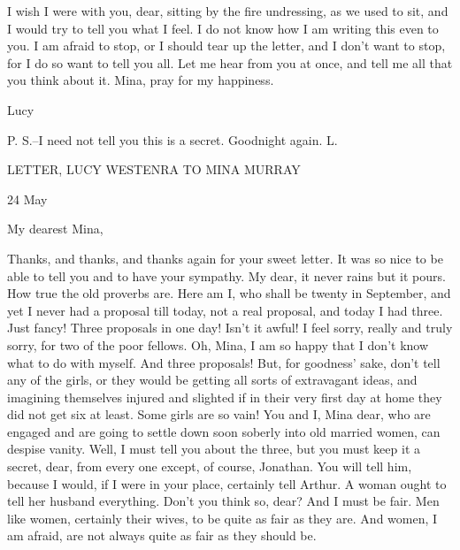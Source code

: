 I wish I were with you, dear, sitting by the fire undressing, as we used to sit, and I would try to tell you what I feel. I do not know how I am writing this even to you. I am afraid to stop, or I should tear up the letter, and I don't want to stop, for I do so want to tell you all. Let me hear from you at once, and tell me all that you think about it. Mina, pray for my happiness. 

Lucy 

P. S.--I need not tell you this is a secret. Goodnight again. L. 

LETTER, LUCY WESTENRA TO MINA MURRAY 

24 May 

My dearest Mina, 

Thanks, and thanks, and thanks again for your sweet letter. It was so nice to be able to tell you and to have your sympathy. My dear, it never rains but it pours. How true the old proverbs are. Here am I, who shall be twenty in September, and yet I never had a proposal till today, not a real proposal, and today I had three. Just fancy! Three proposals in one day! Isn't it awful! I feel sorry, really and truly sorry, for two of the poor fellows. Oh, Mina, I am so happy that I don't know what to do with myself. And three proposals! But, for goodness' sake, don't tell any of the girls, or they would be getting all sorts of extravagant ideas, and imagining themselves injured and slighted if in their very first day at home they did not get six at least. Some girls are so vain! You and I, Mina dear, who are engaged and are going to settle down soon soberly into old married women, can despise vanity. Well, I must tell you about the three, but you must keep it a secret, dear, from every one except, of course, Jonathan. You will tell him, because I would, if I were in your place, certainly tell Arthur. A woman ought to tell her husband everything. Don't you think so, dear? And I must be fair. Men like women, certainly their wives, to be quite as fair as they are. And women, I am afraid, are not always quite as fair as they should be. 


